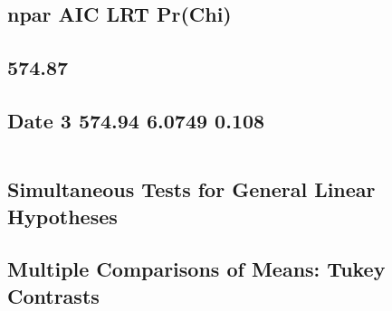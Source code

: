 \documentclass[
]{article}
\begin{document}
\hypertarget{npar-aic-lrt-prchi}{%
\subsection{npar AIC LRT Pr(Chi)}\label{npar-aic-lrt-prchi}}

\hypertarget{section-6}{%
\subsection{\texorpdfstring{ 574.87}{ 574.87}}\label{section-6}}

\hypertarget{date-3-574.94-6.0749-0.108}{%
\subsection{Date 3 574.94 6.0749
0.108}\label{date-3-574.94-6.0749-0.108}}

\begin{verbatim}
\end{verbatim}

\hypertarget{section-7}{%
\subsection{}\label{section-7}}

\hypertarget{simultaneous-tests-for-general-linear-hypotheses}{%
\subsection{Simultaneous Tests for General Linear
Hypotheses}\label{simultaneous-tests-for-general-linear-hypotheses}}

\hypertarget{section-8}{%
\subsection{}\label{section-8}}

\hypertarget{multiple-comparisons-of-means-tukey-contrasts}{%
\subsection{Multiple Comparisons of Means: Tukey
Contrasts}\label{multiple-comparisons-of-means-tukey-contrasts}}

\hypertarget{section-9}{%
\subsection{}\label{section-9}}
\end{document}
